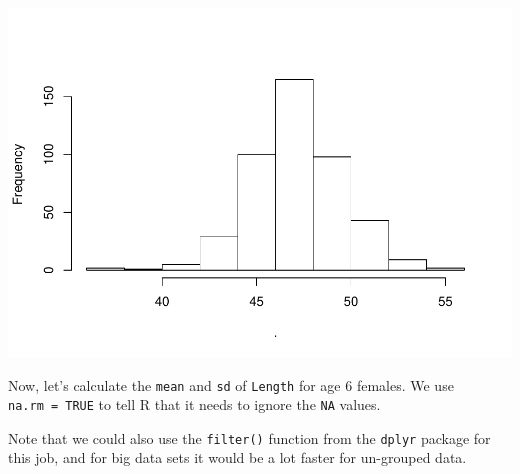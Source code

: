 \documentclass[
]{book}
\newenvironment{Shaded}{\begin{snugshade}}{\end{snugshade}}
\newcommand{\CommentTok}[1]{\textcolor[rgb]{0.56,0.35,0.01}{\textit{#1}}}
\newcommand{\DataTypeTok}[1]{\textcolor[rgb]{0.13,0.29,0.53}{#1}}
\newcommand{\DecValTok}[1]{\textcolor[rgb]{0.00,0.00,0.81}{#1}}
\newcommand{\KeywordTok}[1]{\textcolor[rgb]{0.13,0.29,0.53}{\textbf{#1}}}
\newcommand{\NormalTok}[1]{#1}
\newcommand{\OperatorTok}[1]{\textcolor[rgb]{0.81,0.36,0.00}{\textbf{#1}}}
\newcommand{\OtherTok}[1]{\textcolor[rgb]{0.56,0.35,0.01}{#1}}
\newcommand{\StringTok}[1]{\textcolor[rgb]{0.31,0.60,0.02}{#1}}
\begin{document}
\includegraphics{worstr_files/figure-latex/unnamed-chunk-80-1.pdf}

Now, let's calculate the \texttt{mean} and \texttt{sd} of \texttt{Length} for age 6 females. We use \texttt{na.rm\ =\ TRUE} to tell R that it needs to ignore the \texttt{NA} values.

\begin{Shaded}
\end{Shaded}

Note that we could also use the \texttt{filter()} function from the \texttt{dplyr} package for this job, and for big data sets it would be a lot faster for un-grouped data.
\end{document}
